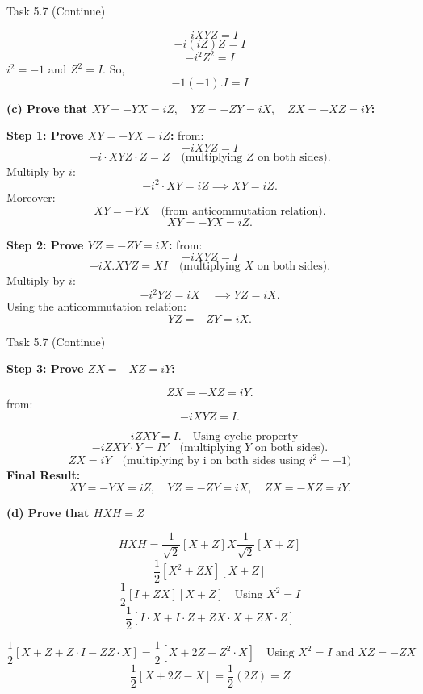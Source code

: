 \documentclass[aspectratio=169]{beamer}
\begin{document}
\begin{frame}{Task 5.7 (Continue)}

{\tiny

\[
-iXYZ = I \]
\[-i(iZ)Z = I \]
\[
-i^2Z^2 = I
\]
\( i^2 = -1 \) and \(Z^2 = I\). So,
\[
-1(-1).I = I
\]



\vspace{0.3cm}

\textbf{(c) Prove that \(XY = -YX = iZ, \quad YZ = -ZY = iX, \quad ZX = -XZ = iY\):}

\textbf{Step 1: Prove \(XY = -YX = iZ\):}
from:
\[
-iXYZ = I
\]
\[
-i \cdot XY Z \cdot Z = Z  \quad \text{(multiplying \(Z\) on both sides)}.
\]
Multiply by \(i\):
\[
-i^2 \cdot XY = i Z \implies XY = iZ.
\]
Moreover:
\[
XY = -YX \quad \text{(from anticommutation relation)}.
\]
\[
XY = -YX = iZ.
\]

\vspace{0.3cm}

\textbf{Step 2: Prove \(YZ = -ZY = iX\):}
from:
\[
-iXYZ = I
\]
\[
-iX.XYZ = XI \quad \text{(multiplying \(X\) on both sides)}.
\]
Multiply by \(i\):
\[
-i^2YZ = iX \quad \implies YZ = iX.
\]
Using the anticommutation relation:
\[
YZ = -ZY = iX.
\]

}

\end{frame}

\begin{frame}{Task 5.7 (Continue)}

{\tiny

\textbf{Step 3: Prove \(ZX = -XZ = iY\):}

\[
ZX = -XZ = iY.
\]
from:
\[
-iXYZ = I.
\]

\[
-iZXY = I. \quad \text {Using cyclic property}
\]
\[
-iZXY \cdot Y = IY \quad \text{(multiplying \(Y\) on both sides)}.
\]
\[
ZX = iY \quad \text{(multiplying by i on both sides using \(i^2 =-1\))}
\]
\textbf{Final Result:}
\[
XY = -YX = iZ, \quad YZ = -ZY = iX, \quad ZX = -XZ = iY.
\]

\textbf{(d) Prove that \(HXH = Z\)}

\[
HXH = \frac{1}{\sqrt{2}}[X + Z] X \frac{1}{\sqrt{2}}[X + Z]
\]
\[
\frac{1}{2}[X^2 + ZX][X+Z]
\]
\[
\frac{1}{2}[I + ZX][X+Z] \quad \text{Using \(X^2 = I\)}
\]
\[
\frac{1}{2}[I \cdot X + I \cdot Z + ZX \cdot X + ZX \cdot Z]
\]

\[
\frac{1}{2}[X + Z + Z\cdot I - ZZ \cdot X] = \frac{1}{2}[X + 2Z - Z^2 \cdot X] \quad \text{Using \(X^2 = I\) and \(XZ = -ZX\)}
\]
\[
\frac{1}{2}[X + 2Z - X] = \frac{1}{2}(2Z) = Z
\]
}

\end{frame}
\end{document}
